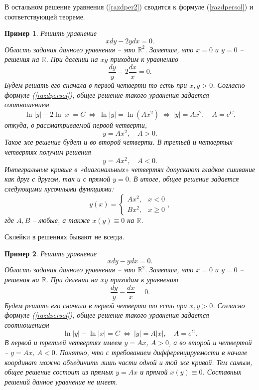\documentclass[a4paper,14pt]{extarticle}
\newtheorem{example}{Пример}[subsection]
\begin{document}
В остальном решение уравнения (\ref{razdper2}) сводится к формуле (\ref{razdpersol}) и соответствующей теореме.
\begin{example}
Решить уравнение 
$$
xdy - 2ydx = 0.
$$	
Область задания данного уравнения -- это $\mathbb R^2$. Заметим, что $x = 0$ и $y = 0$ -- решения на $\mathbb R$. При делении на $xy$ приходим к уравнению
$$
\frac{dy}{y} - 2\frac{dx}{x} = 0.
$$
Будем решать его сначала в первой четверти то есть при $x, y > 0$. Согласно формуле (\ref{razdpersol}), общее решение такого уравнения задается соотношением
$$
\ln |y| - 2 \ln|x| = C \ \Leftrightarrow \ \ln |y| = \ln(Ax^2) \ \Leftrightarrow \ |y| = Ax^2, \quad A = e^C.
$$
откуда, в рассматриваемой первой четверти,
$$
y = Ax^2, \quad A > 0.
$$
Такое же решение будет и во второй четверти. В третьей и четвертых четвертях получим решения
$$
y = Ax^2, \quad A < 0.
$$
Интегральные кривые в «диагональных» четвертях допускают гладкое сшивание как друг с другом, так и с прямой $y = 0$. В итоге, общее решение задается следующими кусочными функциями:
$$
y(x) = \begin{cases}
Ax^2, & x < 0 \\	
Bx^2, & x \geq 0
 \end{cases},
$$
где $A, B$ -- любые, а также $x(y) \equiv 0$ на $\mathbb R$.
\end{example}
Склейки в решениях бывают не всегда.
\begin{example}
Решить уравнение 
$$
xdy - ydx = 0.
$$	
Область задания данного уравнения -- это $\mathbb R^2$. Заметим, что $x = 0$ и $y = 0$ -- решения на $\mathbb R$. При делении на $xy$ приходим к уравнению
$$
\frac{dy}{y} - \frac{dx}{x} = 0.
$$
Будем решать его сначала в первой четверти то есть при $x, y > 0$. Согласно формуле (\ref{razdpersol}), общее решение такого уравнения задается соотношением
$$
\ln |y| - \ln |x| = C \ \Leftrightarrow \ |y| = A|x|, \quad A = e^C.
$$
В первой и третьей четвертях имеем $y = Ax$, $A > 0$, а во второй и четвертой -- $y = Ax$, $A < 0$. Понятно, что с требованием дифференцируемости в начале координат можно объединить лишь части одной и той же кривой. Тем самым, общее решение состоит из прямых $y = Ax$ и прямой $x(y) \equiv 0$. Составных решений данное уравнение не имеет.
\end{example}
\end{document}
